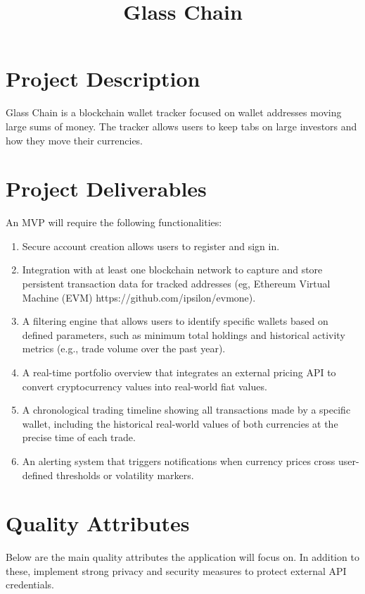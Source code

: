 \title{Glass Chain}

\maketitle

\section*{Project Description}
Glass Chain is a blockchain wallet tracker focused on wallet addresses moving large sums of money. 
The tracker allows users to keep tabs on large investors and how they move their currencies.

\section*{Project Deliverables}
An MVP will require the following functionalities:
\begin{enumerate}
\item Secure account creation allows users to register and sign in.
\item Integration with at least one blockchain network to capture and store persistent transaction data for tracked addresses (eg, Ethereum Virtual Machine (EVM) https://github.com/ipsilon/evmone). 
\item A filtering engine that allows users to identify specific wallets based on defined parameters, such as minimum total holdings and historical activity metrics (e.g., trade volume over the past year). 
\item A real-time portfolio overview that integrates an external pricing API to convert cryptocurrency values into real-world fiat values. 
\item A chronological trading timeline showing all transactions made by a specific wallet, including the historical real-world values of both currencies at the precise time of each trade. 
\item An alerting system that triggers notifications when currency prices cross user-defined thresholds or volatility markers.
\end{enumerate}

\section*{Quality Attributes}
Below are the main quality attributes the application will focus on. 
In addition to these, implement strong privacy and security measures to protect external API credentials.

